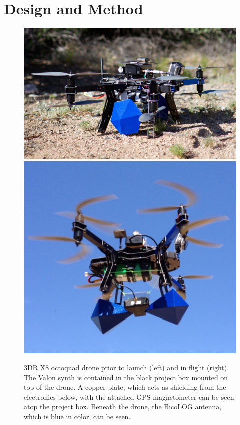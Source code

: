 \documentclass[preprint2,numberedappendix,tighten,twocolappendix]{aastex6}
\begin{document}
\section{Design and Method}


\begin{figure}[h]
\centering
\includegraphics[scale=0.18]{images/drone2.png}
\includegraphics[scale=0.339]{images/drone.png}
\caption{3DR X8 octoquad drone prior to launch (left) and in flight (right).  The Valon synth is contained in the black project box mounted on top of the drone.  A copper plate, which acts as shielding from the electronics below, with the attached GPS magnetometer can be seen atop the project box. Beneath the drone, the BicoLOG antenna, which is blue in color, can be seen.}
\label{fig:drone}
\end{figure}
\end{document}

